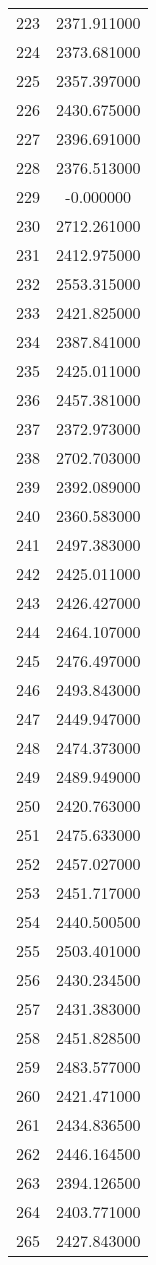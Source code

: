 \documentclass[12pt]{article}
\begin{document}
\begin{longtable}{@{}cc@{}}
223 & 2371.911000 \\
224 & 2373.681000 \\
225 & 2357.397000 \\
226 & 2430.675000 \\
227 & 2396.691000 \\
228 & 2376.513000 \\
229 & -0.000000 \\
230 & 2712.261000 \\
231 & 2412.975000 \\
232 & 2553.315000 \\
233 & 2421.825000 \\
234 & 2387.841000 \\
235 & 2425.011000 \\
236 & 2457.381000 \\
237 & 2372.973000 \\
238 & 2702.703000 \\
239 & 2392.089000 \\
240 & 2360.583000 \\
241 & 2497.383000 \\
242 & 2425.011000 \\
243 & 2426.427000 \\
244 & 2464.107000 \\
245 & 2476.497000 \\
246 & 2493.843000 \\
247 & 2449.947000 \\
248 & 2474.373000 \\
249 & 2489.949000 \\
250 & 2420.763000 \\
251 & 2475.633000 \\
252 & 2457.027000 \\
253 & 2451.717000 \\
254 & 2440.500500 \\
255 & 2503.401000 \\
256 & 2430.234500 \\
257 & 2431.383000 \\
258 & 2451.828500 \\
259 & 2483.577000 \\
260 & 2421.471000 \\
261 & 2434.836500 \\
262 & 2446.164500 \\
263 & 2394.126500 \\
264 & 2403.771000 \\
265 & 2427.843000 \\

\end{longtable}
\end{document}
